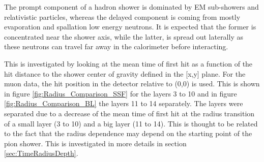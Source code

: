 The prompt component of a hadron shower is dominated by EM sub-showers and relativistic particles, whereas the delayed component is coming from mostly evaporation and spallation low energy neutrons. It is expected that the former is concentrated near the shower axis, while the latter, is spread out laterally as these neutrons can travel far away in the calorimeter before interacting.

This is investigated by looking at the mean time of first hit as a function of the hit distance to the shower center of gravity defined in the [x,y] plane. For the muon data, the hit position in the detector relative to (0,0) is used. This is shown in figure \ref{fig:Radius_Comparison_SSF} for the layers 3 to 10 and in figure \ref{fig:Radius_Comparison_BL} the layers 11 to 14 separately. The layers were separated due to a decrease of the mean time of first hit
at the radius transition of a small layer (3 to 10) and a big layer (11 to 14). This is thought to be related to the fact that the radius dependence may depend on the starting point of the pion shower. This is investigated in more details in section \ref{sec:TimeRadiusDepth}.

